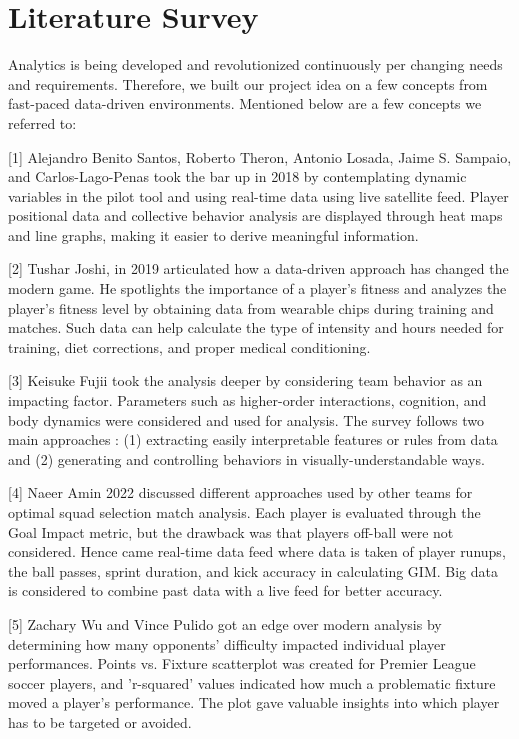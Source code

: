 \documentclass[lettersize]{IEEEtran}
\begin{document}
\section{\textbf{Literature Survey}}
Analytics is being developed and revolutionized continuously per changing needs and requirements. Therefore, we built our project idea on a few concepts from fast-paced data-driven environments. Mentioned below are a few concepts we referred to: 

[1] Alejandro Benito Santos, Roberto Theron, Antonio Losada, Jaime S. Sampaio, and Carlos-Lago-Penas took the bar up in 2018 by contemplating dynamic variables in the pilot tool and using real-time data using live satellite feed. Player positional data and collective behavior analysis are displayed through heat maps and line graphs, making it easier to derive meaningful information. 

[2] Tushar Joshi, in 2019 articulated how a data-driven approach has changed the modern game. He spotlights the importance of a player's fitness and analyzes the player's fitness level by obtaining data from wearable chips during training and matches. Such data can help calculate the type of intensity and hours needed for training, diet corrections, and proper medical conditioning.

[3] Keisuke Fujii took the analysis deeper by considering team behavior as an impacting factor. Parameters such as higher-order interactions, cognition, and body dynamics were considered and used for analysis. The survey follows two main approaches : (1) extracting easily interpretable features or rules from data and (2) generating and controlling behaviors in visually-understandable ways.

[4] Naeer Amin 2022 discussed different approaches used by other teams for optimal squad selection match analysis. Each player is evaluated through the Goal Impact metric, but the drawback was that players off-ball were not considered. Hence came real-time data feed where data is taken of player runups, the ball passes, sprint duration, and kick accuracy in calculating GIM. Big data is considered to combine past data with a live feed for better accuracy.

[5] Zachary Wu and Vince Pulido got an edge over modern analysis by determining how many opponents' difficulty impacted individual player performances. Points vs. Fixture scatterplot was created for Premier League soccer players, and 'r-squared' values indicated how much a problematic fixture moved a player's performance. The plot gave valuable insights into which player has to be targeted or avoided. 
\end{document}
